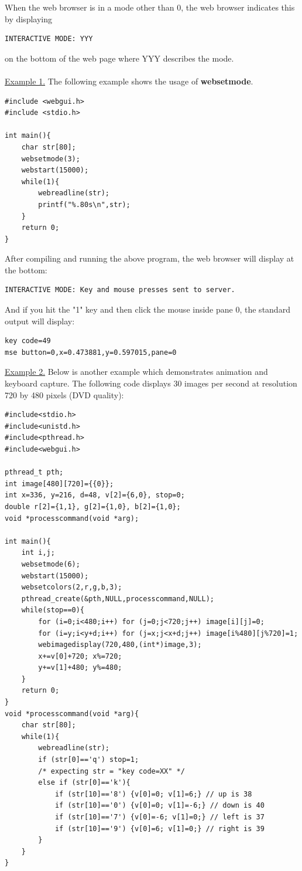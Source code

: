 When the web browser is in a mode other than 0, the web browser indicates this by displaying
\begin{verbatim}
INTERACTIVE MODE: YYY
\end{verbatim}
on the bottom of the web page where YYY describes the mode.\\
\\
\underline{Example 1.} The following example shows the usage of \textbf{websetmode}.
\begin{verbatim}
#include <webgui.h>
#include <stdio.h>

int main(){
    char str[80];
    websetmode(3);
    webstart(15000);
    while(1){
        webreadline(str);
        printf("%.80s\n",str);
    }
    return 0;
}
\end{verbatim}
After compiling and running the above program, the web browser will display at the bottom:
\begin{verbatim}
INTERACTIVE MODE: Key and mouse presses sent to server.
\end{verbatim}
And if you hit the "1" key and then click the mouse inside pane 0, the standard output will display:
\begin{verbatim}
key code=49
mse button=0,x=0.473881,y=0.597015,pane=0
\end{verbatim}
\underline{Example 2.} Below is another example which demonstrates animation and keyboard capture. The following code displays 
30 images per second at resolution 720 by 480 pixels (DVD quality):
\begin{verbatim}
#include<stdio.h>
#include<unistd.h>
#include<pthread.h>
#include<webgui.h>

pthread_t pth;
int image[480][720]={{0}};
int x=336, y=216, d=48, v[2]={6,0}, stop=0;
double r[2]={1,1}, g[2]={1,0}, b[2]={1,0};
void *processcommand(void *arg);

int main(){
    int i,j;
    websetmode(6);
    webstart(15000);
    websetcolors(2,r,g,b,3);
    pthread_create(&pth,NULL,processcommand,NULL);
    while(stop==0){
        for (i=0;i<480;i++) for (j=0;j<720;j++) image[i][j]=0;
        for (i=y;i<y+d;i++) for (j=x;j<x+d;j++) image[i%480][j%720]=1;
        webimagedisplay(720,480,(int*)image,3);
        x+=v[0]+720; x%=720;
        y+=v[1]+480; y%=480;
    }
    return 0;
}
void *processcommand(void *arg){
    char str[80];
    while(1){
        webreadline(str);
        if (str[0]=='q') stop=1;
        /* expecting str = "key code=XX" */
        else if (str[0]=='k'){
            if (str[10]=='8') {v[0]=0; v[1]=6;} // up is 38
            if (str[10]=='0') {v[0]=0; v[1]=-6;} // down is 40
            if (str[10]=='7') {v[0]=-6; v[1]=0;} // left is 37
            if (str[10]=='9') {v[0]=6; v[1]=0;} // right is 39
        }
    }
}
\end{verbatim}
